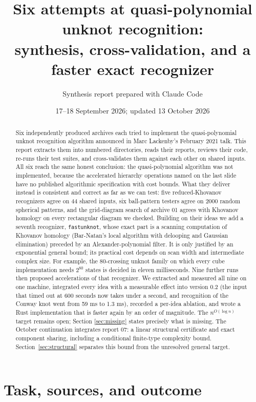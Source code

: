 \documentclass[11pt]{article}
\title{Six attempts at quasi-polynomial unknot recognition:\\
synthesis, cross-validation, and a faster exact recognizer}
\author{Synthesis report prepared with Claude Code}
\date{17--18 September 2026; updated 13 October 2026}
\theoremstyle{remark}
\newcommand{\code}[1]{\texttt{#1}}
\newcommand{\qp}{n^{O(\log n)}}
\begin{document}
\maketitle

\begin{abstract}
Six independently produced archives each tried to implement the quasi-polynomial unknot
recognition algorithm announced in Marc Lackenby's February 2021 talk. This
report extracts them into numbered directories, reads their reports, reviews
their code, re-runs their test suites, and cross-validates them against each
other on shared inputs. All six reach the same honest conclusion: the
quasi-polynomial algorithm was not implemented, because the accelerated
hierarchy operations named on the last slide have no published algorithmic
specification with cost bounds. What they deliver instead is consistent and
correct as far as we can test: five reduced-Khovanov recognizers agree on 44
shared inputs, six ball-pattern testers agree on 2000 random spherical
patterns, and the grid-diagram search of archive 01 agrees with Khovanov
homology on every rectangular diagram we checked. Building on their ideas we
add a seventh recognizer, \code{fastunknot}, whose exact part is a scanning
computation of Khovanov homology (Bar-Natan's local algorithm with delooping
and Gaussian elimination) preceded by an Alexander-polynomial filter. It is
only justified by an exponential general bound; its practical cost depends
on scan width and intermediate complex size. For example, the
80-crossing unknot family on which every cube implementation needs $2^{80}$
states is decided in eleven milliseconds. Nine further runs then proposed
accelerations of that recognizer. We extracted and measured all nine on one
machine, integrated every idea with a measurable effect into version 0.2 (the
input that timed out at 600 seconds now takes under a second, and recognition
of the Conway knot went from 59 ms to 1.3 ms), recorded a per-idea ablation,
and wrote a Rust implementation that is faster again by an order of
magnitude. The $\qp$ target remains open; Section \ref{sec:missing} states
precisely what is missing. The October continuation integrates report 07: a
linear structural certificate and exact component sharing, including a
conditional finite-type complexity bound. Section~\ref{sec:structural}
separates this bound from the unresolved general target.
\end{abstract}

\tableofcontents

\section{Task, sources, and outcome}
\end{document}
